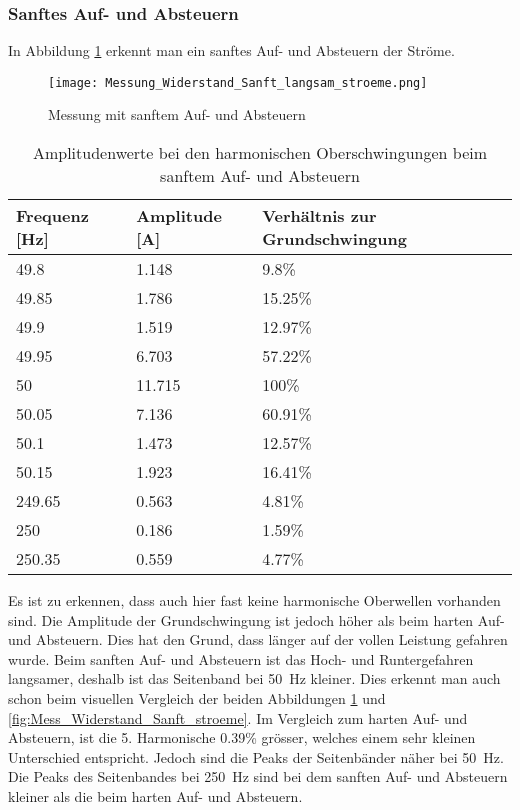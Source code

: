 \newpage
\subsubsection*{Sanftes Auf- und Absteuern}\label{sec:Sanft_Widerstand_stroeme}
In Abbildung \ref{fig:Mess_Widerstand_Sanft_langsam_stroeme} erkennt man ein sanftes Auf- und Absteuern der Ströme.

\begin{figure}[ht!]
	\centering
	\texttt{[image: Messung\_Widerstand\_Sanft\_langsam\_stroeme.png]}	
	\caption{Messung mit sanftem Auf- und Absteuern}\label{fig:Mess_Widerstand_Sanft_langsam_stroeme}
\end{figure}

\begin{table}[ht!]
	\centering
	\begin{tabular}{|l|l|l|}
		\hline
		Frequenz {[}Hz{]} & Amplitude {[}A{]} & Verhältnis zur Grundschwingung	\\ \hline
		49.8              & 1.148             & 9.8\%							\\ \hline
		49.85             & 1.786             & 15.25\%							\\ \hline
		49.9              & 1.519             & 12.97\%							\\ \hline
		49.95             & 6.703             & 57.22\%							\\ \hline
		50                & 11.715            & 100\%							\\ \hline
		50.05             & 7.136             & 60.91\%							\\ \hline
		50.1              & 1.473             & 12.57\%							\\ \hline
		50.15             & 1.923             & 16.41\%							\\ \hline
		249.65            & 0.563             & 4.81\%							\\ \hline
		250               & 0.186             & 1.59\%							\\ \hline
		250.35            & 0.559             & 4.77\%							\\ \hline
	\end{tabular}
	\caption{Amplitudenwerte bei den harmonischen Oberschwingungen beim sanftem Auf- und Absteuern}\label{tab:Sanft_langsam_stroeme}
\end{table}
Es ist zu erkennen, dass auch hier fast keine harmonische Oberwellen vorhanden sind. Die Amplitude der Grundschwingung ist jedoch höher als beim harten Auf- und Absteuern. Dies hat den Grund, dass länger auf der vollen Leistung gefahren wurde. Beim sanften Auf- und Absteuern ist das Hoch- und Runtergefahren langsamer, deshalb ist das Seitenband bei \SI{50}{Hz} kleiner. Dies erkennt man auch schon beim visuellen Vergleich der beiden Abbildungen \ref{fig:Mess_Widerstand_Sanft_langsam_stroeme} und \ref{fig:Mess_Widerstand_Sanft_stroeme}. Im Vergleich zum harten Auf- und Absteuern, ist die 5. Harmonische 0.39\% grösser, welches einem sehr kleinen Unterschied entspricht. Jedoch sind die Peaks der Seitenbänder näher bei \SI{50}{Hz}. Die Peaks des Seitenbandes bei \SI{250}{Hz} sind bei dem sanften Auf- und Absteuern kleiner als die beim harten Auf- und Absteuern.



